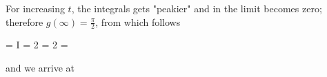 For increasing $t$, the integrals gets "peakier" and in the limit becomes zero; therefore $g(\infty) = \frac{\pi}{2}$, from which follows

\bee
{} =  \rightarrow I = 2  = 2  = \sqrt{2 \pi}
\eee

and we arrive at

\bee
{}
\eee




